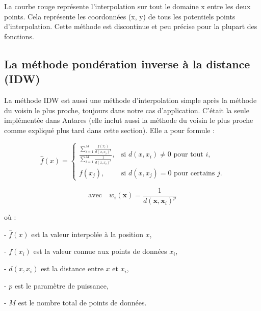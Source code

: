 La courbe rouge représente l'interpolation sur tout le domaine x entre les deux points. Cela représente les coordonnées (x, y) de tous les potentiels points d'interpolation.
Cette méthode est discontinue et peu précise pour la plupart des fonctions.



\subsection{La méthode pondération inverse à la distance (IDW)}\label{sIDW} %

La méthode IDW est aussi une méthode d'interpolation simple après la méthode du voisin le plus proche, toujours dans notre cas d'application. C'était la seule implémentée dans Antares (elle inclut aussi la méthode du voisin le plus proche comme expliqué plus tard dans cette section). Elle a pour formule :

\begin{equation}
    \hat{f}(x) = 
    \begin{cases}
    \frac{\sum_{i=1}^{M} \frac{f(x_i)}{d(x, x_i)^p}}{\sum_{i=1}^{M} \frac{1}{d(x, x_i)^p}}, & \text{si } d(x, x_i) \neq 0 \text{ pour tout } i, \\ 
    f(x_j), & \text{si } d(x, x_j) = 0 \text{ pour certains } j.
    \end{cases}
\end{equation}


\[
\text{avec} \quad w_i(\mathbf{x}) = \frac{1}{d(\mathbf{x}, \mathbf{x}_i)^p}
\]


où :

- \(\hat{f}(x)\) est la valeur interpolée à la position \(x\),

\vspace{-0,2 cm}

- \(f(x_i)\) est la valeur connue aux points de données \(x_i\),

\vspace{-0,2 cm}

- \(d(x, x_i)\) est la distance entre \(x\) et \(x_i\),

\vspace{-0,2 cm}

- \(p\) est le paramètre de puissance,

\vspace{-0,2 cm}

- \(M\) est le nombre total de points de données.

\vspace{0,1 cm}


